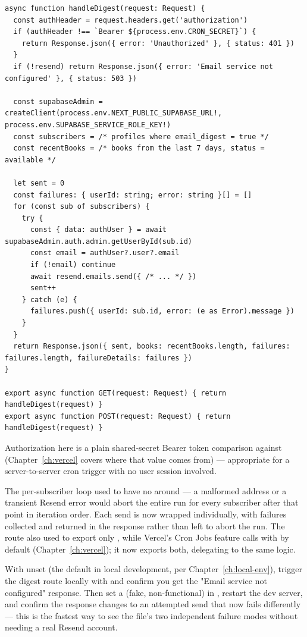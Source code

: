 \begin{lstlisting}[caption={app/api/digest/route.ts — auth gate and the per-subscriber loop}]
async function handleDigest(request: Request) {
  const authHeader = request.headers.get('authorization')
  if (authHeader !== `Bearer ${process.env.CRON_SECRET}`) {
    return Response.json({ error: 'Unauthorized' }, { status: 401 })
  }
  if (!resend) return Response.json({ error: 'Email service not configured' }, { status: 503 })

  const supabaseAdmin = createClient(process.env.NEXT_PUBLIC_SUPABASE_URL!, process.env.SUPABASE_SERVICE_ROLE_KEY!)
  const subscribers = /* profiles where email_digest = true */
  const recentBooks = /* books from the last 7 days, status = available */

  let sent = 0
  const failures: { userId: string; error: string }[] = []
  for (const sub of subscribers) {
    try {
      const { data: authUser } = await supabaseAdmin.auth.admin.getUserById(sub.id)
      const email = authUser?.user?.email
      if (!email) continue
      await resend.emails.send({ /* ... */ })
      sent++
    } catch (e) {
      failures.push({ userId: sub.id, error: (e as Error).message })
    }
  }
  return Response.json({ sent, books: recentBooks.length, failures: failures.length, failureDetails: failures })
}

export async function GET(request: Request) { return handleDigest(request) }
export async function POST(request: Request) { return handleDigest(request) }
\end{lstlisting}

Authorization here is a plain shared-secret Bearer token comparison against  (Chapter~\ref{ch:vercel} covers where that value comes from) — appropriate for a server-to-server cron trigger with no user session involved.

\begin{olknote}
The per-subscriber loop used to have no  around  — a malformed address or a transient Resend error would abort the entire run for every subscriber after that point in iteration order. Each send is now wrapped individually, with failures collected and returned in the response rather than left to abort the run. The route also used to export only , while Vercel's Cron Jobs feature calls with  by default (Chapter~\ref{ch:vercel}); it now exports both, delegating to the same  logic.
\end{olknote}

\begin{olktask}
With  unset (the default in local development, per Chapter~\ref{ch:local-env}), trigger the digest route locally with  and confirm you get the  "Email service not configured" response. Then set a (fake, non-functional)  in , restart the dev server, and confirm the response changes to an attempted send that now fails differently — this is the fastest way to see the file's two independent failure modes without needing a real Resend account.
\end{olktask}
